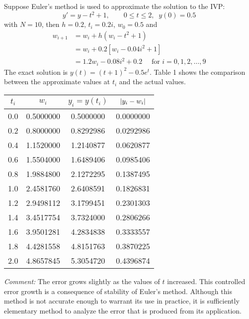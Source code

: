 \documentclass[../main-sheet.tex]{subfiles}
\begin{document}
\begin{ex}
    Suppose Euler's method is used to approximate the solution to the IVP:
    \[
        y'=y-t^2+1,\qquad 0\leq t\leq 2,\;\;y(0)=0.5
    \]
    with \(N=10\), then \(h=0.2\), \(t_i=0.2i\), \(w_0=0.5\) and
    \begin{align*}
        w_{i+1}&=w_i+h(w_i-t^2+1)\\
        &=w_i+0.2[w_i-0.04i^2+1]\\
        &=1.2w_i-0.08i^2+0.2\quad\text{ for } i=0,1,2,\dots,9
    \end{align*}
    The exact solution is \(y(t)=(t+1)^2-0.5e^t\).
    Table 1 shows the comparison between the approximate values at \(t_i\) and the actual values.
    \begin{table}[H]
        \centering
        \begin{tabular}{cccc}
            \toprule
            \(t_i\) & \(w_i\)&\(y_i=y(t_i)\)&\(\left\vert y_i-w_i\right\vert\)\\\midrule
            0.0 & 0.5000000 & 0.5000000 & 0.0000000 \\
            0.2 & 0.8000000 & 0.8292986 & 0.0292986 \\
            0.4 & 1.1520000 & 1.2140877 & 0.0620877 \\
            0.6 & 1.5504000 & 1.6489406 & 0.0985406 \\
            0.8 & 1.9884800 & 2.1272295 & 0.1387495 \\
            1.0 & 2.4581760 & 2.6408591 & 0.1826831 \\
            1.2 & 2.9498112 & 3.1799451 & 0.2301303 \\
            1.4 & 3.4517754 & 3.7324000 & 0.2806266 \\
            1.6 & 3.9501281 & 4.2834838 & 0.3333557 \\
            1.8 & 4.4281558 & 4.8151763 & 0.3870225 \\
            2.0 & 4.8657845 & 5.3054720 & 0.4396874 \\\bottomrule
        \end{tabular}
    \end{table}
    \emph{Comment:} The error grows slightly as the values of \(t\) increased.
    This controlled error growth is a consequence of stability of Euler's method.
    Although this method is not accurate enough to warrant its use in practice, it is sufficiently elementary method to analyze the error that is produced from its application.
\end{ex}
\end{document}
